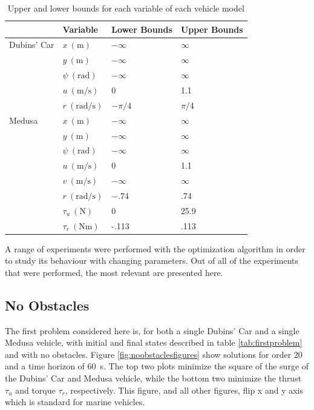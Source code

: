 \begin{table}[h!]
\centering
\begin{tabular}{|l|l|l|l|}
\hline
& Variable & Lower Bounds & Upper Bounds \\ \hline
Dubins' Car & $x\ (\si{\meter})$ & $-\infty$ & $\infty$ \\
& $y\ (\si{\meter})$ & $-\infty$ & $\infty$ \\
& $\psi\ (\si{\radian})$ & $-\infty$ & $\infty$ \\
& $u\ (\si{\meter\per\second})$ & 0 & 1.1 \\
& $r\ (\si{\radian\per\second})$ & $-\pi/4$ & $\pi/4$ \\ \hline
Medusa & $x\ (\si{\meter})$ & $-\infty$ & $\infty$ \\
& $y\ (\si{\meter})$ & $-\infty$ & $\infty$ \\
& $\psi\ (\si{\radian})$ & $-\infty$ & $\infty$ \\
& $u\ (\si{\meter\per\second})$ & 0 & 1.1 \\
& $v\ (\si{\meter\per\second})$ & $-\infty$ & $\infty$ \\
& $r\ (\si{\radian\per\second})$ & $-.74$ & $.74$ \\
& $\tau_u\ (\si{\newton})$ & 0 & 25.9 \\
& $\tau_r\ (\si{\newton\meter})$ & -.113 & .113 \\
\hline
\end{tabular}
\caption{Upper and lower bounds for each variable of each vehicle model}
\label{tab:variablebounds}
\end{table}

\par A range of experiments were performed with the optimization algorithm in order to study its behaviour with changing parameters. Out of all of the experiments that were performed, the most relevant are presented here.


\subsection{No Obstacles}

\par The first problem considered here is, for both a single Dubins' Car and a single Medusa vehicle, with initial and final states described in table \ref{tab:firstproblem} and with no obstacles. Figure \ref{fig:noobstaclesfigures} show solutions for order 20 and a time horizon of \SI{60}{\second}. The top two plots minimize the square of the surge of the Dubins' Car and Medusa vehicle, while the bottom two minimize the thrust $\tau_u$ and torque $\tau_r$, respectively. This figure, and all other figures, flip x and y axis which is standard for marine vehicles.

